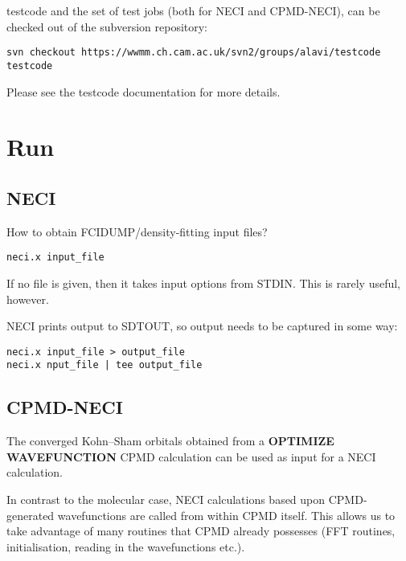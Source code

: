 \documentclass[openany,a4paper,10pt]{manual}
\begin{document}
testcode and the set of test jobs (both for NECI and CPMD-NECI), can be
checked out of the subversion repository:

\begin{Verbatim}[commandchars=@\[\]]
svn checkout https://wwmm.ch.cam.ac.uk/svn2/groups/alavi/testcode testcode
\end{Verbatim}

Please see the testcode documentation for more details.

\resetcurrentobjects


\hypertarget{run}{}\chapter{Run}


\section{NECI}

\begin{notice}[note]
How to obtain FCIDUMP/density-fitting input files?
\end{notice}

\begin{Verbatim}[commandchars=@\[\]]
neci.x input_file
\end{Verbatim}

If no file is given, then it takes input options from STDIN.  This is rarely useful, however.

NECI prints output to SDTOUT, so output needs to be captured in some way:

\begin{Verbatim}[commandchars=@\[\]]
neci.x input_file > output_file
neci.x nput_file | tee output_file
\end{Verbatim}


\section{CPMD-NECI}

The converged Kohn--Sham orbitals obtained from a \textbf{OPTIMIZE
WAVEFUNCTION} CPMD calculation can be used as input for a NECI
calculation.

In contrast to the molecular case, NECI calculations based upon
CPMD-generated wavefunctions are called from within CPMD itself.
This allows us to take advantage of many routines that CPMD already
possesses (FFT routines, initialisation, reading in the wavefunctions
etc.).
\end{document}
